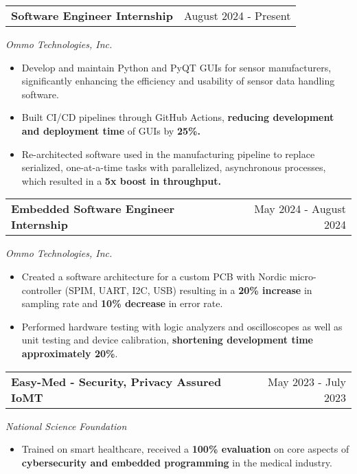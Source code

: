 \documentclass[a4paper,12pt]{article}
\begin{document}
\begin{tabularx}{\linewidth}{@{}Xr@{}}
\textbf{Software Engineer Internship} & \hfill August 2024 - Present
\end{tabularx}
\textit{Ommo Technologies, Inc.}
\vspace{-0.4em}
\begin{itemize}
    \item Develop and maintain Python and PyQT GUIs for sensor manufacturers, significantly enhancing the efficiency and usability of sensor data handling software.
    \item Built CI/CD pipelines through GitHub Actions, \textbf{reducing development and deployment time} of GUIs by \textbf{25\%.}
    \item Re-architected software used in the manufacturing pipeline to replace serialized, one-at-a-time tasks with parallelized, asynchronous processes, which resulted in a \textbf{5x boost in throughput.}
\end{itemize}

\begin{tabularx}{\linewidth}{@{}Xr@{}}
\textbf{Embedded Software Engineer Internship} & \hfill May 2024 - August 2024
\end{tabularx}
\textit{Ommo Technologies, Inc.}
\vspace{-0.4em}
\begin{itemize}   
    \item Created a software architecture for a custom PCB with Nordic micro-controller (SPIM, UART, I2C, USB) resulting in a \textbf{20\% increase} in sampling rate and \textbf{10\% decrease} in error rate.
    \item Performed hardware testing with logic analyzers and oscilloscopes as well as unit testing and device calibration, \textbf{shortening development time approximately 20\%}.
\end{itemize}

\begin{tabularx}{\linewidth}{@{}Xr@{}}
\textbf{Easy-Med - Security, Privacy Assured IoMT} & \hfill May 2023 - July 2023
\end{tabularx}
\textit{National Science Foundation}
\vspace{-0.4em}
\begin{itemize}
    \item Trained on smart healthcare, received a \textbf{100\% evaluation} on core aspects of \textbf{cybersecurity and embedded programming} in the medical industry.
\end{itemize}
\end{document}
